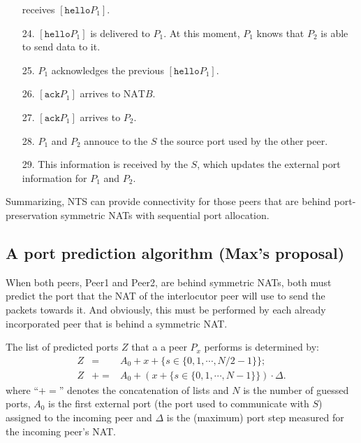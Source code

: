 \begin{itemize}
    receives $[\mathtt{hello} P_1]$.
  \item [24.] $[\mathtt{hello} P_1]$ is delivered to $P_1$. At this
    moment, $P_1$ knows that $P_2$ is able to send data to it.
  \item [25.] $P_1$ acknowledges the previous $[\mathtt{hello} P_1]$.
  \item [26.] $[\mathtt{ack} P_1]$ arrives to $\mathrm{NAT} B$.
  \item [27.] $[\mathtt{ack} P_1]$ arrives to $P_2$.
  \item [28.] $P_1$ and $P_2$ annouce to the $S$ the source port used
    by the other peer.
  \item [29.] This information is received by the $S$, which updates
    the external port information for $P_1$ and $P_2$.
\end{itemize}

Summarizing, NTS can provide connectivity for those peers that are
behind port-preservation symmetric NATs with sequential port
allocation.

\subsection{A port prediction algorithm (Max's proposal)}
When both peers, Peer1 and Peer2, are behind symmetric NATs, both must
predict the port that the NAT of the interlocutor peer will use to
send the packets towards it. And obviously, this must be performed by
each already incorporated peer that is behind a symmetric NAT.

The list of predicted ports $Z$ that a a peer $P_x$ performs is
determined by:
\begin{equation}
  \begin{array}{rcl}
    Z & = & A_0 + x + \{s\in\{0,1,\cdots,N/2-1\}\}; \\
    Z & += & A_0 + (x + \{s\in\{0,1,\cdots, N-1\}\}) \cdot \Delta.
  \end{array}
\end{equation}
where ``$+=$'' denotes the concatenation of lists and $N$ is the
number of guessed ports, $A_0$ is the first external port (the
port used to communicate with $S$) assigned to the incoming peer and
$\Delta$ is the (maximum) port step measured for the incoming peer's
NAT.
